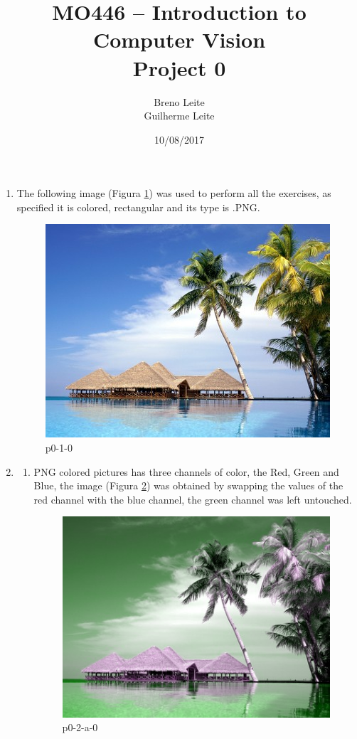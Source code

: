 \documentclass[12pt,a4paper]{article}
\title{MO446 -- Introduction to Computer Vision  \\ Project 0}
\author{Breno Leite  \\ Guilherme Leite}
\date{10/08/2017}
\begin{document}
\maketitle

\begin{enumerate}
\item The following image (Figura \ref{fig:p0-1-0}) was used to perform all the exercises, as specified it is colored, rectangular and its type is .PNG.\\

\begin{figure}[ht]
\centering
\includegraphics{input/p0-1-0}
\caption{p0-1-0}
\label{fig:p0-1-0}
\end{figure}

\item
\begin{enumerate}
\item PNG colored pictures has three channels of color, the Red, Green and Blue, the image (Figura \ref{fig:p0-2-a-0}) was obtained by swapping the values of the red channel with the blue channel, the green channel was left untouched.

\begin{figure}[ht]
\centering
\includegraphics{output/p0-2-a-0}
\caption{p0-2-a-0}
\label{fig:p0-2-a-0}
\end{figure}


\end{enumerate}
\end{enumerate}
\end{document}
